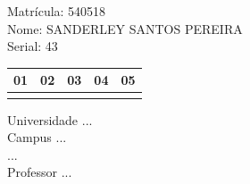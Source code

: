 \documentclass[10pt,a4paper,twocolumn]{report}
\begin{document}
Matrícula: 540518\\ Nome: SANDERLEY SANTOS PEREIRA \\ Serial: 43\\
\begin{tabular}{|l|l|l|l|l|}\hline
01  &02  &03  &04  &05 \\ \hline 
 & & & & \\ \hline 
\end{tabular}
 \cleardoublepage 

\begin{flushleft}
Universidade ...\\
Campus ...\\
...\\
Professor ...\\
\end{flushleft}
\end{document}
